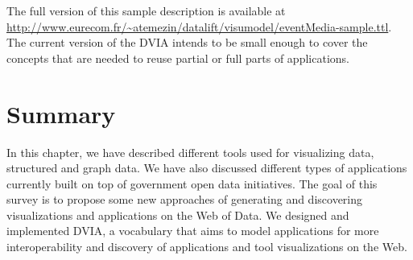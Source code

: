 The full version of this sample description is available at \url{http://www.eurecom.fr/~atemezin/datalift/visumodel/eventMedia-sample.ttl}. The current version of the DVIA intends to be small enough to cover the concepts that are needed to reuse partial or full parts of applications.

\section{Summary}
In this chapter, we have described different tools used for visualizing data, structured and graph data. We have also discussed different types of applications currently built on top of government open data initiatives. The goal of this survey is to propose some new approaches of generating and discovering visualizations and applications on the Web of Data. We designed and implemented DVIA, a vocabulary that aims to model applications for more interoperability and discovery of applications and tool visualizations on the Web.

